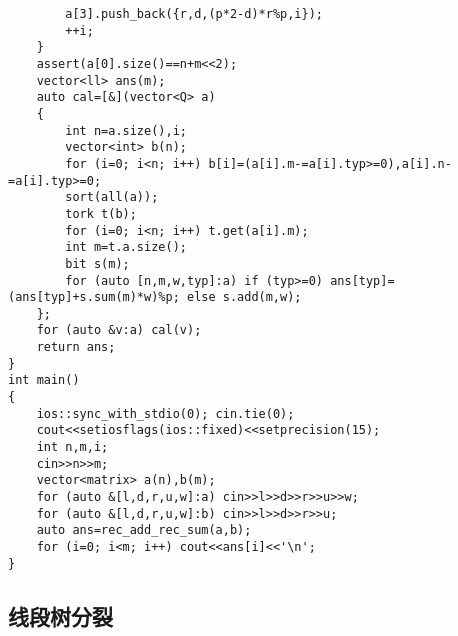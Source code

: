 \documentclass[12pt]{ctexart}
\begin{document}
\begin{lstlisting}
		a[3].push_back({r,d,(p*2-d)*r%p,i});
		++i;
	}
	assert(a[0].size()==n+m<<2);
	vector<ll> ans(m);
	auto cal=[&](vector<Q> a)
	{
		int n=a.size(),i;
		vector<int> b(n);
		for (i=0; i<n; i++) b[i]=(a[i].m-=a[i].typ>=0),a[i].n-=a[i].typ>=0;
		sort(all(a));
		tork t(b);
		for (i=0; i<n; i++) t.get(a[i].m);
		int m=t.a.size();
		bit s(m);
		for (auto [n,m,w,typ]:a) if (typ>=0) ans[typ]=(ans[typ]+s.sum(m)*w)%p; else s.add(m,w);
	};
	for (auto &v:a) cal(v);
	return ans;
}
int main()
{
	ios::sync_with_stdio(0); cin.tie(0);
	cout<<setiosflags(ios::fixed)<<setprecision(15);
	int n,m,i;
	cin>>n>>m;
	vector<matrix> a(n),b(m);
	for (auto &[l,d,r,u,w]:a) cin>>l>>d>>r>>u>>w;
	for (auto &[l,d,r,u,w]:b) cin>>l>>d>>r>>u;
	auto ans=rec_add_rec_sum(a,b);
	for (i=0; i<m; i++) cout<<ans[i]<<'\n';
}

\end{lstlisting}

\subsection{线段树分裂}
\end{document}
